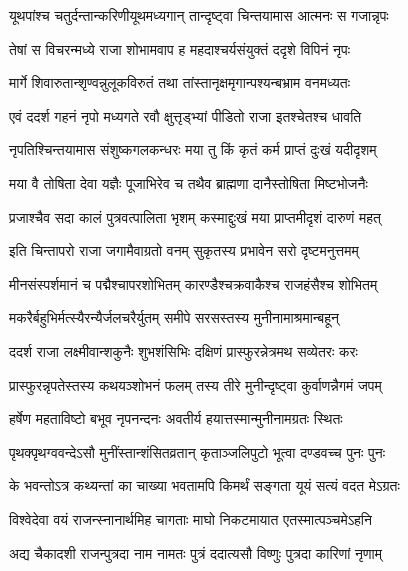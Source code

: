 \twolineshloka
{यूथपांश्च चतुर्दन्तान्करिणीयूथमध्यगान्}
{तान्दृष्ट्वा चिन्तयामास आत्मनः स गजान्नृपः}%

\twolineshloka
{तेषां स विचरन्मध्ये राजा शोभामवाप ह}
{महदाश्चर्यसंयुक्तं ददृशे विपिनं नृपः}%

\twolineshloka
{मार्गे शिवारुतान्शृण्वन्नुलूकविरुतं तथा}
{तांस्तानृक्षमृगान्पश्यन्बभ्राम वनमध्यतः}%

\twolineshloka
{एवं ददर्श गहनं नृपो मध्यगते रवौ}
{क्षुत्तृड्भ्यां पीडितो राजा इतश्चेतश्च धावति}%

\twolineshloka
{नृपतिश्चिन्तयामास संशुष्कगलकन्धरः}
{मया तु किं कृतं कर्म प्राप्तं दुःखं यदीदृशम्}%

\twolineshloka
{मया वै तोषिता देवा यज्ञैः पूजाभिरेव च}
{तथैव ब्राह्मणा दानैस्तोषिता मिष्टभोजनैः}%

\twolineshloka
{प्रजाश्चैव सदा कालं पुत्रवत्पालिता भृशम्}
{कस्माद्दुःखं मया प्राप्तमीदृशं दारुणं महत्}%

\twolineshloka
{इति चिन्तापरो राजा जगामैवाग्रतो वनम्}
{सुकृतस्य प्रभावेन सरो दृष्टमनुत्तमम्}%

\twolineshloka
{मीनसंस्पर्शमानं च पद्मैश्चापरशोभितम्}
{कारण्डैश्चक्रवाकैश्च राजहंसैश्च शोभितम्}%

\twolineshloka
{मकरैर्बहुभिर्मत्स्यैरन्यैर्जलचरैर्युतम्}
{समीपे सरसस्तस्य मुनीनामाश्रमान्बहून्}%

\twolineshloka
{ददर्श राजा लक्ष्मीवान्शकुनैः शुभशंसिभिः}
{दक्षिणं प्रास्फुरन्नेत्रमथ सव्येतरः करः}%

\twolineshloka
{प्रास्फुरन्नृपतेस्तस्य कथयञ्शोभनं फलम्}
{तस्य तीरे मुनीन्दृष्ट्वा कुर्वाणन्नैगमं जपम्}%

\twolineshloka
{हर्षेण महताविष्टो बभूव नृपनन्दनः}
{अवतीर्य हयात्तस्मान्मुनीनामग्रतः स्थितः}%

\twolineshloka
{पृथक्पृथग्ववन्देऽसौ मुनींस्तान्शंसितव्रतान्}
{कृताञ्जलिपुटो भूत्वा दण्डवच्च पुनः पुनः}%



\twolineshloka
{के भवन्तोऽत्र कथ्यन्तां का चाख्या भवतामपि}
{किमर्थं सङ्गता यूयं सत्यं वदत मेऽग्रतः}%


\twolineshloka
{विश्वेदेवा वयं राजन्स्नानार्थमिह चागताः}
{माघो निकटमायात एतस्मात्पञ्चमेऽहनि}%

\twolineshloka
{अद्य चैकादशी राजन्पुत्रदा नाम नामतः}
{पुत्रं ददात्यसौ विष्णुः पुत्रदा कारिणां नृणाम्}%

